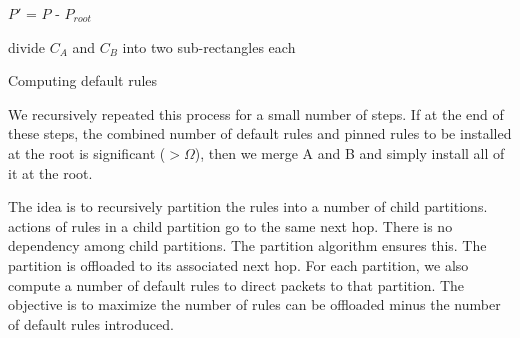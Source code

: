 \begin{algorithm}
  $P'$ = $P$ - $P_{root}$\;
   { 
   {
   	divide $C_A$ and $C_B$ into two sub-rectangles each\;
	
   }
  }
 \caption{Computing default rules}
 \label{alg:default_rule}
\end{algorithm}

We recursively repeated this process for a small number of steps. If at the end of these steps, the combined number of default rules and pinned rules 
to be installed at the root is significant ($> \Omega$), then we merge A and B and simply install all of it at the root.







\iffalse
The idea is to recursively partition the rules into a number of child
partitions. actions of rules in a child partition go to the same next hop. There
is no dependency among child partitions. The partition algorithm ensures this.  
The partition is offloaded to its associated next hop. For each partition, we
also compute a number of default rules to direct packets to that partition. The
objective is to maximize the number of rules can be offloaded minus the number
of default rules introduced. 

